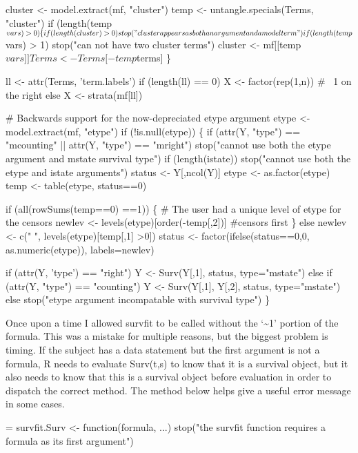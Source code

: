 \documentclass{article}
\begin{document}
\begin{nwchunk}
 cluster <- model.extract(mf, "cluster")
 temp <- untangle.specials(Terms, "cluster")
 if (length(temp$vars)>0) \{
     if (length(cluster) >0) stop("cluster appears as both an argument and a model term")
     if (length(temp$vars) > 1) stop("can not have two cluster terms")
     cluster <- mf[[temp$vars]]
     Terms <- Terms[-temp$terms]
 \}
 
 ll <- attr(Terms, 'term.labels')
 if (length(ll) == 0) X <- factor(rep(1,n))  # ~1 on the right
 else X <- strata(mf[ll])
 
 # Backwards support for the now-depreciated etype argument
 etype <- model.extract(mf, "etype")
 if (!is.null(etype)) \{
     if (attr(Y, "type") == "mcounting" ||
         attr(Y, "type") == "mright")
         stop("cannot use both the etype argument and mstate survival type")
     if (length(istate)) 
         stop("cannot use both the etype and istate arguments")
     status <- Y[,ncol(Y)]
     etype <- as.factor(etype)
     temp <- table(etype, status==0)
 
     if (all(rowSums(temp==0) ==1)) \{
         # The user had a unique level of etype for the censors
         newlev <- levels(etype)[order(-temp[,2])] #censors first
     \}
     else newlev <- c(" ", levels(etype)[temp[,1] >0])
     status <- factor(ifelse(status==0,0, as.numeric(etype)),
                          labels=newlev)
 
     if (attr(Y, 'type') == "right")
         Y <- Surv(Y[,1], status, type="mstate")
     else if (attr(Y, "type") == "counting")
         Y <- Surv(Y[,1], Y[,2], status, type="mstate")
     else stop("etype argument incompatable with survival type")
 \}
\end{nwchunk}

Once upon a time I allowed survfit to be called without the 
`\textasciitilde 1' portion of the formula.
This was a mistake for multiple reasons, but the biggest problem is timing.
If the subject has a data statement but the first argument is not a formula,
R needs to evaluate Surv(t,s) to know that it is a survival object, 
but it also needs to know that this is a survival object before evaluation
in order to dispatch the correct method.  
The method below helps give a useful error message in some cases.
\begin{nwchunk}
=
 survfit.Surv <- function(formula, ...)
     stop("the survfit function requires a formula as its first argument")
\end{nwchunk}
\end{document}
